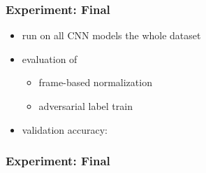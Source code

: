 \begin{frame}
  \frametitle{Experiment: Final}
  \begin{itemize}
    \item run on all CNN models the whole dataset
    \item evaluation of
    \begin{itemize}
     \item frame-based normalization
     \item adversarial label train
    \end{itemize}
    \item validation accuracy:
    \vspace{-0.5cm}
  \begin{figure}[!ht]
    \centering
  \end{figure}
  \end{itemize}
\end{frame}

\begin{frame}
  \frametitle{Experiment: Final}
  
\end{frame}

